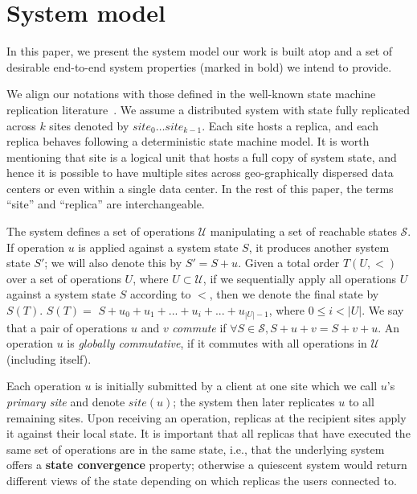 \section{System model}
\label{ch:por:sysmodel}

In this paper, we present the system model our work is built atop and
a set of desirable end-to-end system properties (marked in bold) we intend to provide.

We align our notations with those defined in the well-known state
machine replication literature~\cite{Schneider1990RSM}. We assume a distributed system with state 
fully replicated across $k$ sites denoted by $\textit{site}_0\ldots \textit{site}_{k-1}$. Each site
hosts a replica, and each replica behaves following a deterministic state machine model.
It is worth mentioning that site is a logical unit that hosts a full copy of system state,
and hence it is possible to have multiple sites across geo-graphically dispersed data
centers or even within a single data center. In the rest of this paper, the terms ``site'' and ``replica'' are interchangeable.

The system defines a set of operations $\mathcal{U}$ manipulating
a set of reachable states $\mathcal{S}$. 
If operation $u$ is applied against a system state $S$, 
it produces another system state $S'$; we will also denote this by $S'=S+u$. 
Given a total order $T(U, <)$ over a
set of operations $U$, where $U \subset \mathcal{U}$, if we sequentially apply
all operations $U$ against a system state $S$ according
to $<$, then we denote the final state by $S(T)$. $S(T) = $
$S+u_{0} + u_{1} + ... + u_{i} + ... + u_{|U|-1}$,
where $0\leq i<|U|$. We say that a pair of operations $u$ and $v$ {\em commute} 
if $\forall S \in \mathcal{S},S+u+v=S+v+u$. An operation $u$
is {\it globally commutative}, if it commutes
with all operations in $\mathcal{U}$ (including itself).

Each operation $u$ is initially submitted by a client at one site which we
call $u$'s \emph{primary site} and denote $\textit{site}(u)$;
the system then later replicates $u$ to all remaining sites. Upon receiving an operation, replicas
at the recipient sites apply it against their local state. It is important that 
all replicas that have executed the same set of operations are in the same state, 
i.e., that the underlying system offers a {\bf state convergence} property; 
otherwise a quiescent system would return different views of the
state depending on which replicas the users connected to.


